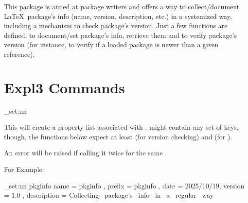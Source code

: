 \documentclass[10pt]{article}
\begin{document}
  

\begin{typesetabstract}

This package is aimed at package writers and offers a way to collect/document \LaTeX\ package's info (name, version, description, etc.) in a systemized way, including a mechanism to check package's version. Just a few functions are defined, to document/set package's info, retrieve them and to verify package's version (for instance, to verify if a loaded package is newer than a given reference).

\end{typesetabstract}







\section{Expl3 Commands}\label{expl3-cmds}


\begin{codedescribe}{\pkginfo_set:nn}
\begin{codesyntax}%
\end{codesyntax}
This will create a property list associated with .  might contain any set of keys, though, the functions below expect at least  (for version checking) and  (for \tsobj{\PkgDescription}).
\end{codedescribe}
\begin{tsremark}
  An error will be raised if calling it twice for the same .
\end{tsremark}
For Example:
\begin{codestore}[demoA]
\pkginfo_set:nn {pkginfo}
  { 
    name         = {pkginfo} ,
    prefix       = {pkginfo} ,
    date         = {2025/10/19},
    version      = {1.0} ,
    description  = {Collecting~ package's~ info~ in~ a~ regular~ way}
  }
\end{codestore}
\end{document}
